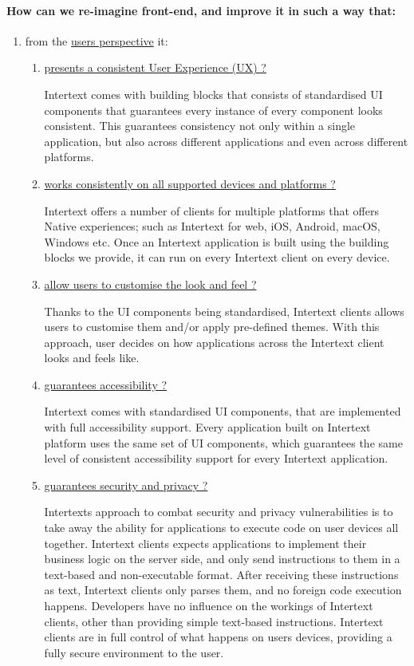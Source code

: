\paragraph{How can we re-imagine front-end, and improve it in such a way that:}
\begin{enumerate}
  \item from the \underline{users perspective} it:
  \begin{enumerate}
    \item \underline{presents a consistent User Experience (UX) ?}
    
    Intertext comes with building blocks that consists of standardised UI components that guarantees every instance of every component looks consistent. This guarantees consistency not only within a single application, but also across different applications and even across different platforms.
    
    \item \underline{works consistently on all supported devices and platforms ?}

    Intertext offers a number of clients for multiple platforms that offers Native experiences; such as Intertext for web, iOS, Android, macOS, Windows etc. Once an Intertext application is built using the building blocks we provide, it can run on every Intertext client on every device.
    
    \item \underline{allow users to customise the look and feel ?}
    
    Thanks to the UI components being standardised, Intertext clients allows users to customise them and/or apply pre-defined themes. With this approach, user decides on how applications across the Intertext client looks and feels like.
    
    \item \underline{guarantees accessibility ?}

    Intertext comes with standardised UI components, that are implemented with full accessibility support. Every application built on Intertext platform uses the same set of UI components, which guarantees the same level of consistent accessibility support for every Intertext application.

    \item \underline{guarantees security and privacy ?}

    Intertexts approach to combat security and privacy vulnerabilities is to take away the ability for applications to execute code on user devices all together. Intertext clients expects applications to implement their business logic on the server side, and only send instructions to them in a text-based and non-executable format. After receiving these instructions as text, Intertext clients only parses them, and no foreign code execution happens. Developers have no influence on the workings of Intertext clients, other than providing simple text-based instructions. Intertext clients are in full control of what happens on users devices, providing a fully secure environment to the user.
    

\end{enumerate}
\end{enumerate}
